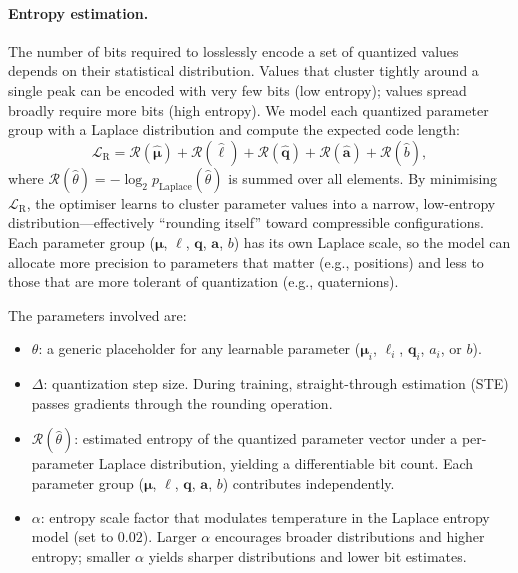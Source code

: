 \documentclass[11pt,a4paper]{article}
\begin{document}
\paragraph{Entropy estimation.}
The number of bits required to losslessly encode a set of quantized values depends on their statistical distribution.  Values that cluster tightly around a single peak can be encoded with very few bits (low entropy); values spread broadly require more bits (high entropy).  We model each quantized parameter group with a Laplace distribution and compute the expected code length:
\begin{equation}
\mathcal{L}_{\mathrm{R}} = \mathcal{R}(\widehat{\boldsymbol{\mu}}) + \mathcal{R}(\widehat{\boldsymbol{\ell}}) + \mathcal{R}(\widehat{\mathbf{q}}) + \mathcal{R}(\widehat{\mathbf{a}}) + \mathcal{R}(\widehat{b}),
\label{eq:rate}
\end{equation}
where $\mathcal{R}(\widehat{\theta}) = -\log_2 p_{\mathrm{Laplace}}(\widehat{\theta})$ is summed over all elements.  By minimising $\mathcal{L}_{\mathrm{R}}$, the optimiser learns to cluster parameter values into a narrow, low-entropy distribution---effectively ``rounding itself'' toward compressible configurations.  Each parameter group ($\boldsymbol{\mu}$, $\boldsymbol{\ell}$, $\mathbf{q}$, $\mathbf{a}$, $b$) has its own Laplace scale, so the model can allocate more precision to parameters that matter (e.g., positions) and less to those that are more tolerant of quantization (e.g., quaternions).

The parameters involved are:
\begin{itemize}
    \item $\theta$: a generic placeholder for any learnable parameter ($\boldsymbol{\mu}_i$, $\boldsymbol{\ell}_i$, $\mathbf{q}_i$, $a_i$, or $b$).
    \item $\Delta$: quantization step size.  During training, straight-through estimation (STE) passes gradients through the rounding operation.
    \item $\mathcal{R}(\widehat{\theta})$: estimated entropy of the quantized parameter vector under a per-parameter Laplace distribution, yielding a differentiable bit count.  Each parameter group ($\boldsymbol{\mu}$, $\boldsymbol{\ell}$, $\mathbf{q}$, $\mathbf{a}$, $b$) contributes independently.
    \item $\alpha$: entropy scale factor that modulates temperature in the Laplace entropy model (set to $0.02$).  Larger $\alpha$ encourages broader distributions and higher entropy; smaller $\alpha$ yields sharper distributions and lower bit estimates.
\end{itemize}
\end{document}

